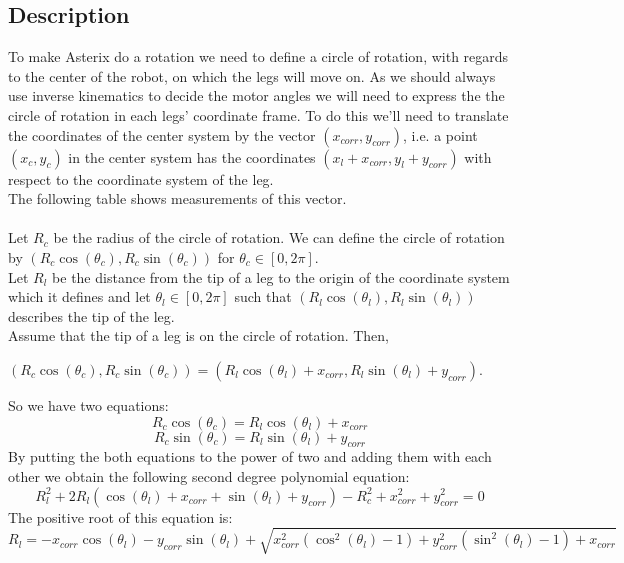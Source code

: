 \documentclass[11pt, a4paper]{article}
\newcommand{\coord}[2]{\left(#1,#2\right)}
\begin{document}
\subsection{Description}
To make Asterix do a rotation we need to define a circle of rotation, with regards to the center of the robot, on which the legs will move on.
As we should always use inverse kinematics to decide the motor angles we will need to express the the circle of rotation in each legs' coordinate frame. To do this we'll need to translate the coordinates of the center system by the vector $(x_{corr}, y_{corr})$, i.e. a point $\left(x_c,y_c\right)$ in the center system has the coordinates $\left(x_l + x_{corr},y_l+y_{corr}\right)$ with respect to the coordinate system of the leg.\\ 
The following table shows measurements of this vector. \\
\vspace{0.5cm}
\\
Let $R_c$ be the radius of the circle of rotation. We can define the circle of rotation by $\left(R_c \cos(\theta_c), R_c \sin(\theta_c)\right)$ for $\theta_c \in \left[0,2\pi\right]$.\\
Let $R_l$ be the distance from the tip of a leg to the origin of the coordinate system which it defines and let $\theta_l \in \left[0,2\pi\right]$ such that $\left(R_l \cos(\theta_l), R_l \sin(\theta_l)\right)$ describes the tip of the leg.\\
Assume that the tip of a leg is on the circle of rotation. Then, \\
\begin{center}
$\coord{R_c\cos(\theta_c)}{R_c\sin(\theta_c)} = \coord{R_l\cos(\theta_l)+x_{corr}}{R_l\sin(\theta_l)+y_{corr}}$.
\end{center}
So we have two equations:
\begin{equation}
R_c\cos(\theta_c) = R_l\cos(\theta_l)+x_{corr}
\end{equation}
\begin{equation}
R_c\sin(\theta_c) = R_l\sin(\theta_l)+y_{corr}
\end{equation}
By putting the both equations to the power of two and adding them with each other we obtain the following second degree polynomial equation:
\begin{equation*}
R_l^2 + 2R_l\left(\cos(\theta_l)+x_{corr}+\sin(\theta_l)+y_{corr}\right) - R_c^2 + x_{corr}^2 + y_{corr}^2 = 0
\end{equation*}
The positive root of this equation is:
\begin{equation*}
R_l = -x_{corr}\cos(\theta_l)-y_{corr}\sin(\theta_l)+\sqrt{x_{corr}^2\left(\cos^2(\theta_l)-1\right) + y_{corr}^2\left(\sin^2(\theta_l)-1\right)+x_{corr}}
\end{equation*} 
\end{document}
